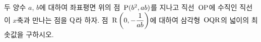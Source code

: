 두 양수 $a$, $b$에 대하여 좌표평면 위의 점~$\mathrm{P}(b^2{,}\mkern3mu\mathopen{}ab)$를 지나고 직선~$\mathrm{OP}$에 수직인 직선이 $x$축과 만나는 점을 $\mathrm{Q}$라 하자. 점~$\mathrm{R}\left(0{,}\mkern3mu\mathopen{}-\dfrac{1}{ab}\right)$에 대하여 삼각형~$\mathrm{OQR}$의 넓이의 최솟값을 구하시오. 
